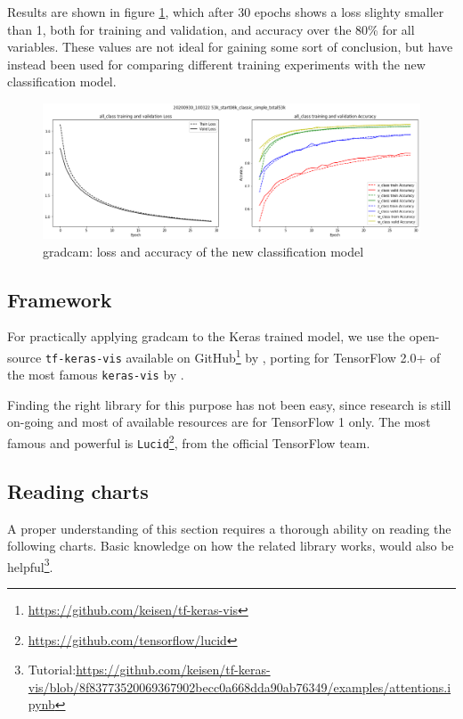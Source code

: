 Results are shown in figure \ref{fig:gradcam-retrain-simple}, which after 30 epochs shows a loss slighty smaller than 1, both for training and validation, and accuracy over the 80\% for all variables. These values are not ideal for gaining some sort of conclusion, but have instead been used for comparing different training experiments with the new classification model.

\begin{figure}[!h]
	\centering
	\includegraphics[width=1\textwidth]{"contents/images/04-metrics-class-simple"}
	\caption[\gls{gradcam}: loss and accuracy of the new classification model]{\gls{gradcam}: loss and accuracy of the new classification model}
	\label{fig:gradcam-retrain-simple}
\end{figure}



\subsection{Framework}
\label{subsec:gradcam-framework}

For practically applying \gls{gradcam} to the Keras trained model, we use the open-source \texttt{tf-keras-vis} available on GitHub\footnote{\url{https://github.com/keisen/tf-keras-vis}} by \cite{tf-keras-vis}, porting for TensorFlow 2.0+ of the most famous \texttt{keras-vis} by \cite{keras-vis}.

Finding the right library for this purpose has not been easy, since research is still on-going and most of available resources are for TensorFlow 1 only. The most famous and powerful is \texttt{Lucid}\footnote{\url{https://github.com/tensorflow/lucid}}, from the official TensorFlow team.


\subsection{Reading charts}
\label{subsec:gradcam-reading}

A proper understanding of this section requires a thorough ability on reading the following charts. Basic knowledge on how the related library works, would also be helpful\footnote{Tutorial:\url{https://github.com/keisen/tf-keras-vis/blob/8f83773520069367902becc0a668dda90ab76349/examples/attentions.ipynb}}.

